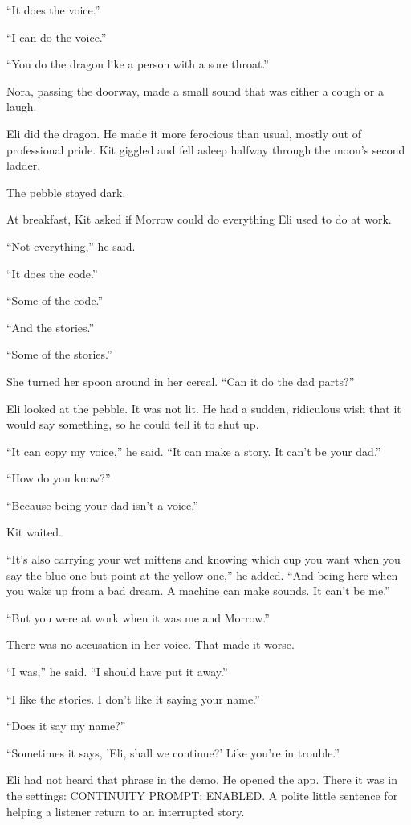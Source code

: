 \documentclass[11pt,openany]{book}
\begin{document}
``It does the voice.''

``I can do the voice.''

``You do the dragon like a person with a sore throat.''

Nora, passing the doorway, made a small sound that was either a cough or a laugh.

Eli did the dragon. He made it more ferocious than usual, mostly out of professional pride. Kit giggled and fell asleep halfway through the moon's second ladder.

The pebble stayed dark.

At breakfast, Kit asked if Morrow could do everything Eli used to do at work.

``Not everything,'' he said.

``It does the code.''

``Some of the code.''

``And the stories.''

``Some of the stories.''

She turned her spoon around in her cereal. ``Can it do the dad parts?''

Eli looked at the pebble. It was not lit. He had a sudden, ridiculous wish that it would say something, so he could tell it to shut up.

``It can copy my voice,'' he said. ``It can make a story. It can't be your dad.''

``How do you know?''

``Because being your dad isn't a voice.''

Kit waited.

``It's also carrying your wet mittens and knowing which cup you want when you say the blue one but point at the yellow one,'' he added. ``And being here when you wake up from a bad dream. A machine can make sounds. It can't be me.''

``But you were at work when it was me and Morrow.''

There was no accusation in her voice. That made it worse.

``I was,'' he said. ``I should have put it away.''

``I like the stories. I don't like it saying your name.''

``Does it say my name?''

``Sometimes it says, 'Eli, shall we continue?' Like you're in trouble.''

Eli had not heard that phrase in the demo. He opened the app. There it was in the settings: CONTINUITY PROMPT: ENABLED. A polite little sentence for helping a listener return to an interrupted story.
\end{document}
